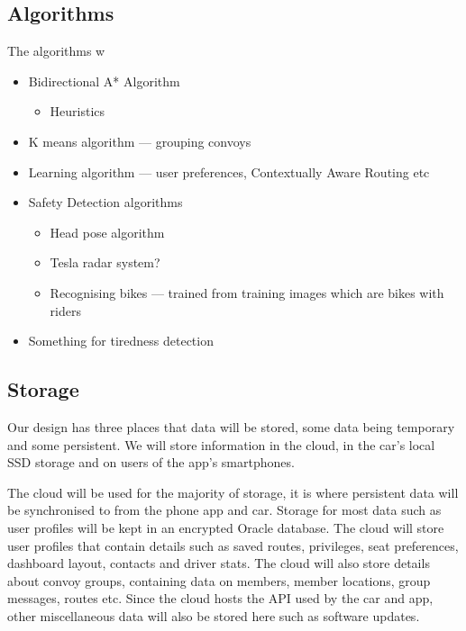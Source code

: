 \documentclass{article}
\begin{document}
\subsection{Algorithms}\label{ssec:algorithms}
The algorithms w
\begin{itemize}
  \item Bidirectional A* Algorithm
    \begin{itemize}
      \item Heuristics
    \end{itemize}
  \item K means algorithm --- grouping convoys
  \item Learning algorithm --- user preferences, Contextually Aware Routing etc
  \item Safety Detection algorithms
    \begin{itemize}
      \item Head pose algorithm
      \item Tesla radar system?
      \item Recognising bikes --- trained from training images which are bikes with riders
    \end{itemize}
  \item Something for tiredness detection
\end{itemize}

\subsection{Storage}\label{ssec:storage} %
Our design has three places that data will be stored, some data being temporary and some persistent. We will store information in the cloud, in the car's local SSD storage and on users of the app's smartphones.

The cloud will be used for the majority of storage, it is where persistent data will be synchronised to from the phone app and car. Storage for most data such as user profiles will be kept in an encrypted Oracle database. The cloud will store user profiles that contain details such as saved routes, privileges, seat preferences, dashboard layout, contacts and driver stats. The cloud will also store details about convoy groups, containing data on members, member locations, group messages, routes etc. Since the cloud hosts the API used by the car and app, other miscellaneous data will also be stored here such as software updates.
\end{document}

